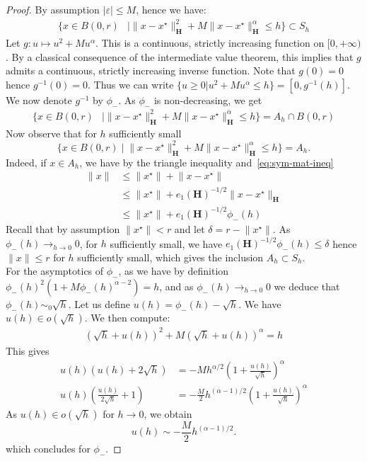 \begin{proof}
By assumption $\lvert\varepsilon\rvert\leq M$, hence we have: 
\begin{align*}
\{x\in B(0,r) & \mid\lVert x-x^{\star}\rVert_{\mathbf{H}}^{2}+M\lVert x-x^{\star}\rVert_{\mathbf{H}}^{\alpha}\leq h\}\subset S_{h}
\end{align*}
Let $g\colon u\mapsto u^{2}+Mu^{\alpha}$. This is a continuous,
strictly increasing function on $[0,+\infty)$. By a classical consequence
of the intermediate value theorem, this implies that $g$ admits a
continuous, strictly increasing inverse function. Note that $g(0)=0$
hence $g^{-1}(0)=0$. Thus we can write $\{u\geq 0|u^{2}+Mu^{\alpha}\le h\}=[0,g^{-1}(h)]$.
We now denote $g^{-1}$ by $\phi_{-}$. As $\phi_{-}$ is non-decreasing,
we get
\begin{align*}
\{x\in B(0,r) & \mid\lVert x-x^{\star}\rVert_{\mathbf{H}}^{2}+M\lVert x-x^{\star}\rVert_{\mathbf{H}}^{\alpha}\leq h\}=A_{h}\cap B(0,r)
\end{align*}
Now observe that for $h$ sufficiently small
\[
\{x\in B(0,r)\mid\lVert x-x^{\star}\rVert_{\mathbf{H}}^{2}+M\lVert x-x^{\star}\rVert_{\mathbf{H}}^{\alpha}\leq h\}=A_{h}.
\]
Indeed, if $x\in A_{h}$, we have by the triangle inequality and~\eqref{eq:sym-mat-ineq}
\begin{align*}
\lVert x\rVert & \le\lVert x^{\star}\rVert+\lVert x-x^{\star}\rVert\\
 & \le\lVert x^{\star}\rVert+e_{1}(\mathbf{H})^{-1/2}\lVert x-x^{\star}\rVert_{\mathbf{H}}\\
 & \le\lVert x^{\star}\rVert+e_{1}(\mathbf{H})^{-1/2}\phi_{-}(h)
\end{align*}
Recall that by assumption $\lVert x^{\star}\rVert<r$ and let $\delta=r-\lVert x^{\star}\rVert$.
As $\phi_{-}(h)\rightarrow_{h\rightarrow0}0$, for $h$ sufficiently
small, we have $e_{1}(\mathbf{H})^{-1/2}\phi_{-}(h)\le\delta$ hence
$\lVert x\rVert\le r$ for $h$ sufficiently small, which gives the inclusion $A_h \subset S_h$.\\
For the asymptotics of $\phi_{-}$, as we have by definition $\phi_{-}(h)^{2}(1+M\phi_{-}(h)^{\alpha-2})=h$,
and as $\phi_{-}(h)\rightarrow_{h\rightarrow0}0$ we deduce that $\phi_{-}(h)\sim_{0}\sqrt{h}$.
Let us define $u(h)=\phi_{-}(h)-\sqrt{h}$. We have $u(h)\in o(\sqrt{h})$.
We then compute: 
\begin{align*}
(\sqrt{h}+u(h))^{2}+M(\sqrt{h}+u(h))^{\alpha}=h
\end{align*}
This gives
\begin{align*}
u(h)(u(h)+2\sqrt{h}) & =-Mh^{\alpha/2}(1+\frac{u(h)}{\sqrt{h}})^{\alpha}\\
u(h)(\frac{u(h)}{2\sqrt{h}}+1) & =-\frac{M}{2}h^{(\alpha-1)/2}(1+\frac{u(h)}{\sqrt{h}})^{\alpha}
\end{align*}
As $u(h)\in o(\sqrt{h})$ for $h\rightarrow0$, we obtain
\[
u(h)\sim-\frac{M}{2}h^{(\alpha-1)/2}.
\]
which concludes for $\phi_{-}$.


\end{proof}
